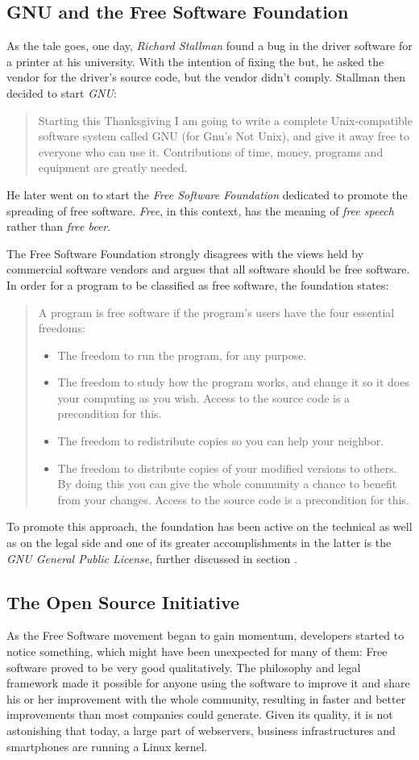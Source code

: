\documentclass{article}
\begin{document}
\subsection{GNU and the Free Software Foundation}
As the tale goes, one day, \emph{Richard Stallman} found a bug
in the driver software for a printer at his university. With
the intention of fixing the but, he asked the vendor for the
driver's source code, but the vendor didn't comply. Stallman then
decided to start \emph{GNU}:
\begin{quote}
Starting this Thanksgiving I am going to write a complete
Unix-compatible software system called GNU (for Gnu's Not Unix),
and give it away free to everyone who can use it.
Contributions of time, money, programs and equipment
are greatly needed. 
\end{quote} 
He later went on to start the \emph{Free Software Foundation}
dedicated to promote the spreading of free software. \emph{Free},
in this context, has the meaning of \emph{free speech} rather than
\emph{free beer}.

The Free Software Foundation strongly disagrees with the views held
by commercial software vendors and argues that all software should
be free software. 
In order for a program to be classified as free
software, the foundation states:
\begin{quote}
A program is free software if the program's users have
the four essential freedoms:
\begin{itemize}
  \item The freedom to run the program, for any purpose.
  \item The freedom to study how the program works,
and change it so it does your computing as you wish.
Access to the source code is a precondition for this.
  \item The freedom to redistribute copies so you can help
your neighbor.
\item The freedom to distribute copies of your modified versions to
others. By doing this you can give the whole community a chance
to benefit from your changes. Access to the source code is a
precondition for this.
\end{itemize}
\end{quote}
To promote this approach, the foundation has been active on the
technical as well as on the legal side and one of its greater
accomplishments in the latter is the \emph{GNU General Public
License}, further discussed in section .
\subsection{The Open Source Initiative}
As the Free Software movement began to gain momentum, developers
started to notice something, which might have been unexpected for
many of them: Free software proved to be very good qualitatively.
The philosophy and legal framework made it possible for anyone using
the software to improve it and share his or her improvement
with the whole community, resulting in faster and better improvements
than most companies could generate. Given its quality, it is not
astonishing that
today, a large part of webservers, business infrastructures and
smartphones are running a Linux kernel.
\end{document}
